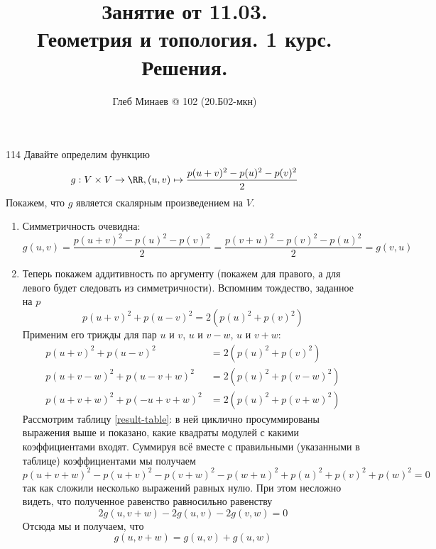 \documentclass[12pt,a4paper]{article}
\title{Занятие от 11.03.\\Геометрия и топология. 1 курс.\\Решения.}
\author{Глеб Минаев @ 102 (20.Б02-мкн)}
\begin{document}
    \maketitle

    \begin{problem}{114}
        Давайте определим функцию
        \[g: V \times V \to \RR, (u, v) \mapsto \frac{p(u+v)^2 - p(u)^2 - p(v)^2}{2}\]
        Покажем, что $g$ является скалярным произведением на $V$.
        \begin{enumerate}
            \item Симметричность очевидна:
                \[
                    g(u, v)
                    = \frac{p(u+v)^2 - p(u)^2 - p(v)^2}{2}
                    = \frac{p(v+u)^2 - p(v)^2 - p(u)^2}{2}
                    = g(v, u)
                \]

            \item Теперь покажем аддитивность по аргументу (покажем для правого, а для левого будет следовать из симметричности). Вспомним тождество, заданное на $p$
                \[p(u+v)^2 + p(u-v)^2 = 2(p(u)^2 + p(v)^2)\]
                Применим его трижды для пар $u$ и $v$, $u$ и $v-w$, $u$ и $v+w$:
                \begin{align}
                    p(u+v)^2 + p(u-v)^2 &= 2(p(u)^2 + p(v)^2) \label{eq1}\\
                    p(u+v-w)^2 + p(u-v+w)^2 &= 2(p(u)^2 + p(v-w)^2) \label{eq2}\\
                    p(u+v+w)^2 + p(-u+v+w)^2 &= 2(p(u)^2 + p(v+w)^2) \label{eq3}
                \end{align}
                Рассмотрим таблицу \ref{result-table}: в ней циклично просуммированы выражения выше и показано, какие квадраты модулей с какими коэффициентами входят. Суммируя всё вместе с правильными (указанными в таблице) коэффициентами мы получаем
                \[p(u+v+w)^2 - p(u+v)^2 - p(v+w)^2 - p(w+u)^2 + p(u)^2 + p(v)^2 + p(w)^2 = 0\]
                так как сложили несколько выражений равных нулю. При этом несложно видеть, что полученное равенство равносильно равенству
                \[2g(u, v+w) - 2g(u, v) - 2g(v, w) = 0\]
                Отсюда мы и получаем, что
                \[g(u, v + w) = g(u, v) + g(u, w)\]


\end{enumerate}
\end{problem}
\end{document}
